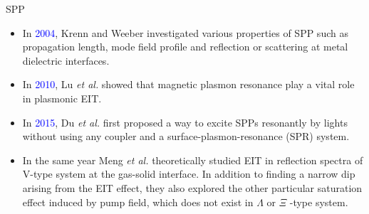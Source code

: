 \documentclass[9pt,aspectratio94]{beamer}
\begin{document}
\begin{frame}{SPP}
\begin{itemize}
\item In \textcolor{blue}{2004}, Krenn and Weeber investigated various properties of SPP such as propagation length, mode field profile and reflection or scattering at metal dielectric interfaces. 



    \item  In \textcolor{blue}{2010}, Lu \textit{et al.} showed that
magnetic plasmon resonance play a vital role in plasmonic EIT. %

\end{itemize}
\end{frame}
 \begin{frame}
 \begin{itemize}    
 \item In \textcolor{blue}{2015}, Du \textit{et al.} first proposed a way to excite SPPs resonantly by lights without using any coupler and a surface-plasmon-resonance (SPR) system.

\item In the same year Meng \textit{et al.} theoretically studied EIT in reflection spectra of V-type system at the gas-solid interface. In addition to finding a narrow dip arising from the EIT effect, they also explored the other particular saturation effect induced by pump field, which does not exist in $\Lambda$ or $\Xi$ -type system.
\end{itemize}
\end{frame}
\end{document}
